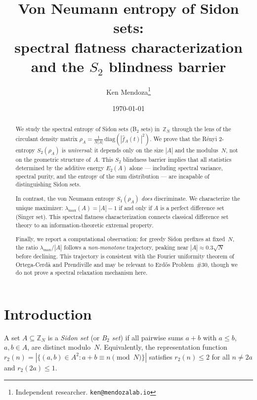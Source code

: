 \documentclass[11pt]{article}
\title{Von Neumann entropy of Sidon sets:\\
spectral flatness characterization and the $S_2$ blindness barrier}
\author{Ken Mendoza\thanks{Independent researcher. \texttt{ken@mendozalab.io}}}
\date{\today}
\theoremstyle{definition}
\theoremstyle{remark}
\newcommand{\Z}{\mathbb{Z}}
\newcommand{\fhat}{\widehat{f}}
\newcommand{\lmax}{\lambda_{\max}}
\begin{document}
\maketitle

\begin{abstract}
We study the spectral entropy of Sidon sets (B$_2$ sets) in~$\Z_N$
through the lens of the circulant density matrix
$\rho_A = \frac{1}{N|A|}\,\text{diag}(|\fhat_A(t)|^2)$.
We prove that the R\'enyi $2$-entropy $S_2(\rho_A)$
is \emph{universal}: it depends only on the size $|A|$ and the
modulus~$N$, not on the geometric structure of~$A$.
This $S_2$ blindness barrier implies that all statistics determined
by the additive energy $E_2(A)$ alone --- including spectral variance,
spectral purity, and the entropy of the sum distribution --- are
incapable of distinguishing Sidon sets.

In contrast, the von Neumann entropy $S_1(\rho_A)$ \emph{does}
discriminate.  We characterize the unique maximizer:
$\lmax(A) = |A|-1$ if and only if $A$ is a perfect difference set
(Singer set).  This spectral flatness characterization connects
classical difference set theory to an information-theoretic extremal
property.

Finally, we report a computational observation: for greedy Sidon
prefixes at fixed~$N$, the ratio $\lmax/|A|$ follows a
\emph{non-monotone} trajectory, peaking near $|A| \approx 0.3\sqrt{N}$
before declining.  This trajectory is consistent with the Fourier
uniformity theorem of Ortega-Cerd\`a and Prendiville and may
be relevant to Erd\H{o}s Problem~\#30,
though we do not prove a spectral relaxation mechanism here.
\end{abstract}

\section{Introduction}\label{sec:intro}

A set $A \subseteq \Z_N$ is a \emph{Sidon set} (or \emph{B$_2$ set})
if all pairwise sums $a + b$ with $a \le b$, $a,b \in A$, are
distinct modulo~$N$.  Equivalently, the representation function
$r_2(n) = |\{(a,b) \in A^2 : a + b \equiv n \pmod{N}\}|$ satisfies
$r_2(n) \le 2$ for all $n \ne 2a$ and $r_2(2a) \le 1$.
\end{document}
